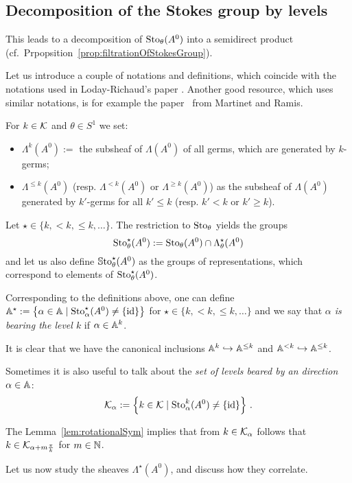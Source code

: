 \subsection{Decomposition of the Stokes group by levels}
 This leads to a decomposition of $\operatorname{Sto}_\theta(A^0)$ into a
semidirect product (cf.\ Prpopsition~\ref{prop:filtrationOfStokesGroup}).

Let us introduce a couple of notations and definitions, which coincide with the
notations used in Loday-Richaud's paper \cite{Loday1994}.
Another good resource, which uses similar notations, is for example the
paper~\cite[362f]{Martinet1991} from Martinet and Ramis.
\begin{notations}
  For $k\in\mathcal{K}$ and $\theta\in S^1$ we set:
  \begin{itemize}
    \item $\Lambda^{k}(A^0):=$ the subsheaf of $\Lambda(A^0)$ of all germs,
      which are generated by $k$-germs;
    \item $\Lambda^{\leq k}(A^0)$ (resp. $\Lambda^{<k}(A^0)$ or
      $\Lambda^{\geq k}(A^0)$) as the subsheaf of $\Lambda(A^0)$ generated by
      $k'$-germs for all $k'\leq k$ (resp. $k'<k$ or $k'\geq k$).
  \end{itemize}
  Let $\star\in\{k,<k,\leq k,\dots\}$.
  The restriction to $\operatorname{Sto}_\theta$ yields the groups
  \[
    \operatorname{Sto}_\theta^\star(A^0):=\operatorname{Sto}_\theta(A^0)\cap\Lambda_\theta^{\star}(A^0)
  \]
  and let us also define $\operatorname{\mathbb{S}to}^\star_\theta(A^0)$ as the groups of
  representations, which correspond to elements of  $\operatorname{Sto}^\star_\theta(A^0)$.
\end{notations}
Corresponding to the definitions above, one can define
$\mathbb{A}^\star:=\left\{\alpha\in\mathbb{A}\mid\operatorname{Sto}_\alpha^\star(A^0)\neq\{\operatorname{id}\}\right\}$
for $\star\in\{k,<k,\leq k,\dots\}$ and we say that \emph{$\alpha$ is bearing
the level $k$} if $\alpha\in\mathbb{A}^k$.
\begin{rem}
  It is clear that we have the canonical inclusions
  $\mathbb{A}^k\hookrightarrow\mathbb{A}^{\leq k}$ and
  $\mathbb{A}^{<k}\hookrightarrow\mathbb{A}^{\leq k}$.
\end{rem}
Sometimes it is also useful to talk about the \emph{set of levels beared by an
direction $\alpha\in\mathbb{A}$}:
\[
  \mathcal{K}_\alpha:=\left\{k\in\mathcal{K}\mid\operatorname{Sto}_\alpha^k(A^0)\neq\{\operatorname{id}\}\right\} \,.
\]
\begin{cor}
  The Lemma~\ref{lem:rotationalSym} implies that from $k\in\mathcal{K}_{\alpha}$
  follows that $k\in\mathcal{K}_{\alpha+m\frac{\pi}{k}}$ for $m\in\mathbb{N}$.
\end{cor}
Let us now study the sheaves $\Lambda^\star(A^0)$, and discuss how they
correlate.

